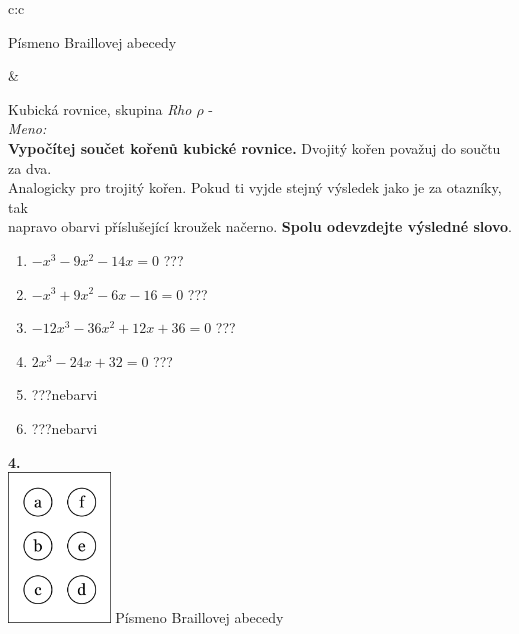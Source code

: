 \documentclass[10pt]{report}
\begin{document}
\begin{tabular}{c:c}
\begin{minipage}[c][99mm][t]{0.49\linewidth}
\begin{center}
\begin{minipage}{0.20\linewidth}
\begin{center}
{\small Písmeno Braillovej abecedy}
\end{center}
\end{minipage}
\end{center}
\end{minipage}
&
\begin{minipage}[c][99mm][t]{0.49\linewidth}
\begin{center}
\vspace{7mm}
{\huge Kubická rovnice, skupina \textit{Rho $\rho$} -}\\[4.5mm]
\textit{Meno:}\phantom{xxxxxxxxxxxxxxxxxxxxxxxxxxxxxxxxxxxxxxxxxxxxxxxxxxxxxxxxxxxxxxxxx}\\[3.5mm]
\textbf{Vypočítej součet kořenů kubické rovnice.} Dvojitý kořen považuj do součtu za dva.\\Analogicky pro trojitý kořen. Pokud ti vyjde stejný výsledek jako je za otazníky, tak\\napravo obarvi příslušející kroužek načerno. \textbf{Spolu odevzdejte výsledné slovo}.\\[3mm]
\begin{minipage}{0.77\linewidth}
\begin{center}
\begin{varwidth}{\textwidth}
\begin{enumerate}
\large
\item $-x^3-9x^2-14x=0$\quad \dotfill\; ???\;\dotfill {}
\item $-x^3+9x^2-6x-16=0$\quad \dotfill\; ???\;\dotfill {}
\item $-12x^3-36x^2+12x+36=0$\quad \dotfill\; ???\;\dotfill {}
\item $2x^3-24x+32=0$\quad \dotfill\; ???\;\dotfill {}
\item \quad \dotfill\; ???\;\dotfill \quad nebarvi
\item \quad \dotfill\; ???\;\dotfill \quad nebarvi
\end{enumerate}
\end{varwidth}
\end{center}
\end{minipage}
\begin{minipage}{0.20\linewidth}
\begin{center}
{\Huge\bfseries 4.} \\[2mm]
\includegraphics[height=40mm]{../images/braille.png}
{\small Písmeno Braillovej abecedy}
\end{center}
\end{minipage}
\end{center}
\end{minipage}

\end{tabular}
\end{document}
